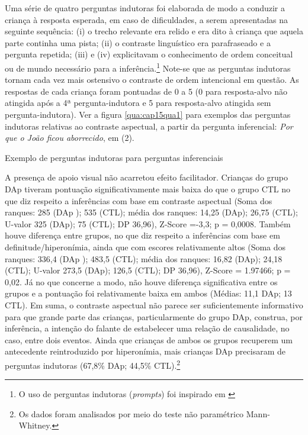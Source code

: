 \documentclass[output=paper,colorlinks,citecolor=brown,booklanguage=portuguese]{langscibook}
\begin{document}
Uma série de quatro perguntas indutoras foi elaborada de modo a conduzir a criança à resposta esperada, em caso de dificuldades, a serem apresentadas na seguinte sequência: (i) o trecho relevante era relido e era dito à criança que aquela parte continha uma pista; (ii) o contraste linguístico era parafraseado e a pergunta repetida; (iii) e (iv) explicitavam o conhecimento de ordem conceitual ou de mundo necessário para a inferência.\footnote{O uso de perguntas indutoras (\emph{prompts}) foi inspirado em \citep{Norbury2002}} Note-se que as perguntas indutoras tornam cada vez mais ostensivo o contraste de ordem intencional em questão. As respostas de cada criança foram pontuadas de 0 a 5 (0 para resposta-alvo não atingida após a 4ª pergunta-indutora e 5 para resposta-alvo atingida sem pergunta-indutora). Ver a figura \ref{qua:cap15qua1} para exemplos das perguntas indutoras relativas ao contraste aspectual, a partir da pergunta inferencial: \emph{Por que o João ficou aborrecido}, em (2).

\begin{Quadro}
\caption{{Exemplo de perguntas indutoras para perguntas inferenciais}}
\label{qua:cap15qua1}
\end{Quadro}

A presença de apoio visual não acarretou efeito facilitador. Crianças do grupo DAp tiveram pontuação significativamente mais baixa do que o grupo CTL no que diz respeito a inferências com base em contraste aspectual (Soma dos ranques: 285 (DAp ); 535 (CTL); média dos ranques: 14,25 (DAp); 26,75 (CTL); U-valor 325 (DAp); 75 (CTL); DP 36,96), Z-Score =-3,3; p =  0,0008. Também houve diferença entre grupos, no que diz respeito a inferências com base em definitude/hiperonímia, ainda que com escores relativamente altos (Soma dos ranques: 336,4 (DAp ); 483,5 (CTL); média dos ranques: 16,82 (DAp); 24,18 (CTL); U-valor 273,5 (DAp); 126,5 (CTL); DP 36,96), Z-Score = 1.97466; p =  0,02. Já no que concerne a modo, não houve diferença significativa entre os grupos e a pontuação foi relativamente baixa em ambos (Médias: 11,1 DAp; 13 CTL). Em suma, o contraste aspectual não parece ser suficientemente informativo para que grande parte das crianças, particularmente do grupo DAp, construa, por inferência, a intenção do falante de estabelecer uma relação de causalidade, no caso, entre dois eventos. Ainda que crianças de ambos os grupos recuperem um antecedente reintroduzido por hiperonímia, mais crianças DAp precisaram de perguntas indutoras (67,8\% DAp; 44,5\% CTL).\footnote{Os dados foram analisados por meio do teste não paramétrico Mann-Whitney.} 
\end{document}
